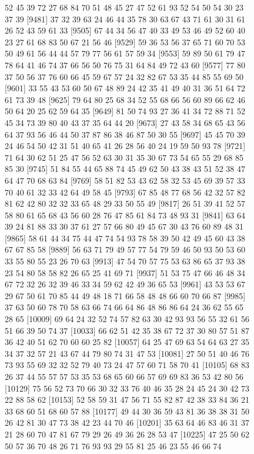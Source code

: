 \documentclass{article}
\begin{document}
\begin{figure}[H]
\begin{Schunk}
\begin{Soutput}
 [9457] 52 45 39 72 27 68 84 70 51 48 45 27 47 52 61 93 52 54 50 54 30 23 37 39
 [9481] 37 32 39 63 24 46 44 35 78 30 63 67 43 71 61 30 31 61 26 52 43 59 61 33
 [9505] 67 44 34 56 47 40 33 49 53 46 49 52 60 40 23 27 61 68 83 50 67 21 56 46
 [9529] 59 36 53 56 37 65 71 60 70 53 50 49 61 56 44 44 57 79 77 56 61 57 59 34
 [9553] 59 89 50 61 79 47 78 64 41 46 74 37 66 56 50 76 75 31 64 84 49 72 43 60
 [9577] 77 80 37 50 56 37 76 60 66 45 59 67 57 24 32 82 67 53 35 44 85 55 69 50
 [9601] 33 55 43 53 60 50 67 48 89 24 42 35 41 49 40 31 36 51 64 72 61 73 39 48
 [9625] 79 64 80 25 68 34 52 55 68 66 56 60 89 66 62 46 50 64 20 25 62 59 64 35
 [9649] 81 50 74 93 27 36 41 34 72 88 71 52 45 34 73 39 80 40 43 37 35 64 44 20
 [9673] 27 43 58 34 68 65 43 56 64 37 93 56 46 44 50 37 87 86 38 46 87 50 30 55
 [9697] 45 45 70 39 24 46 54 50 42 31 51 40 65 41 26 28 56 40 24 19 59 50 93 78
 [9721] 71 64 30 62 51 25 47 56 52 63 30 31 35 30 67 73 54 65 55 29 68 85 85 30
 [9745] 51 84 55 44 65 88 74 45 49 62 50 43 38 43 51 52 38 47 64 47 70 68 63 84
 [9769] 58 51 82 53 43 62 58 32 53 45 69 39 57 33 70 40 61 32 33 42 64 49 58 45
 [9793] 67 85 48 77 68 56 42 32 57 82 81 62 42 80 32 32 33 65 48 29 33 50 55 49
 [9817] 26 51 39 41 52 57 58 80 61 65 68 43 56 60 28 76 47 85 61 84 73 48 93 31
 [9841] 63 64 39 24 81 88 33 30 37 61 27 57 66 80 49 45 67 30 43 76 60 89 48 31
 [9865] 58 61 44 34 75 44 47 74 54 93 78 58 39 50 42 49 45 60 43 38 67 67 85 58
 [9889] 56 63 71 79 49 57 77 54 79 59 46 50 93 50 53 60 33 55 80 55 23 26 70 63
 [9913] 47 54 70 57 75 53 63 86 65 37 93 38 23 54 80 58 58 82 26 65 25 41 69 71
 [9937] 51 53 75 47 66 46 48 34 67 72 32 26 32 39 46 33 34 59 62 42 49 36 65 53
 [9961] 43 53 53 67 29 67 50 61 70 85 44 49 48 18 71 66 58 48 48 66 60 70 66 87
 [9985] 37 63 50 60 78 70 58 63 66 74 66 64 86 48 86 86 64 24 36 62 55 65 28 65
[10009] 69 64 24 32 52 74 57 82 63 30 42 93 93 56 55 32 61 56 51 66 39 50 74 37
[10033] 66 62 51 42 35 38 67 72 37 30 80 57 51 87 36 42 40 51 62 70 60 60 25 82
[10057] 64 25 47 69 63 54 64 63 27 35 34 37 32 57 21 43 67 44 79 80 74 31 47 53
[10081] 27 50 51 40 46 76 73 93 55 69 32 32 52 79 40 73 24 47 57 60 71 58 70 41
[10105] 68 83 26 37 44 55 57 57 53 35 53 68 65 60 66 57 69 69 83 36 53 42 80 56
[10129] 75 56 52 73 70 66 30 32 33 76 40 46 35 28 24 45 24 30 42 73 22 88 58 62
[10153] 52 58 59 31 47 56 71 55 82 87 42 38 33 84 36 21 33 68 60 51 68 60 57 88
[10177] 49 44 30 36 59 43 81 36 38 38 31 50 26 42 81 30 47 73 38 42 23 44 70 46
[10201] 35 63 64 46 83 46 31 37 21 28 60 70 47 81 67 79 29 26 49 36 26 28 53 47
[10225] 47 25 50 62 50 57 36 70 48 26 71 76 93 93 29 55 81 25 46 23 55 46 66 74

\end{Soutput}
\end{Schunk}
\end{figure}
\end{document}

